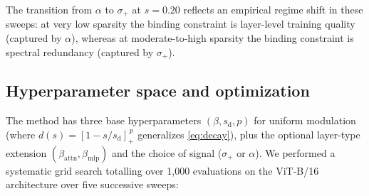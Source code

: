 \documentclass[11pt]{article}
\theoremstyle{plain}
\theoremstyle{definition}
\theoremstyle{remark}
\newcommand{\1}{\mathbf{1}}
\begin{document}
The transition from \(\alpha\) to \(\sigma_+\) at \(s=0.20\) reflects an empirical regime shift in these sweeps: at very low sparsity the binding constraint is layer-level training quality (captured by \(\alpha\)), whereas at moderate-to-high sparsity the binding constraint is spectral redundancy (captured by \(\sigma_+\)).

\subsection{Hyperparameter space and optimization}
\label{subsec:hp_space}

The method has three base hyperparameters \((\beta, s_{\mathrm{d}}, p)\) for uniform modulation (where \(d(s) = [1-s/s_{\mathrm{d}}]_+^{\,p}\) generalizes \eqref{eq:decay}), plus the optional layer-type extension \((\beta_{\mathrm{attn}}, \beta_{\mathrm{mlp}})\) and the choice of signal (\(\sigma_+\) or \(\alpha\)).  We performed a systematic grid search totalling over 1{,}000 evaluations on the ViT-B/16 architecture over five successive sweeps:
\end{document}
